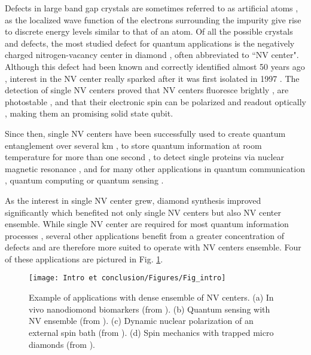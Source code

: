 \documentclass[a4paper, 11pt]{book}
\begin{document}
Defects in large band gap crystals are sometimes referred to as artificial atoms \citep{buluta2011natural}, as the localized wave function of the electrons surrounding the impurity  give rise to discrete energy levels similar to that of an atom. Of all the possible crystals and defects, the most studied defect for quantum applications is the negatively charged nitrogen-vacancy center in diamond \citep{aharonovich2016solid, de2021materials}, often abbreviated to ``NV center". Although this defect had been known and correctly identified almost 50 years ago \citep{davies1976optical}, interest in the NV center really sparked after it was first isolated in 1997 \citep{gruber1997scanning}. The detection of single NV centers proved that NV centers fluoresce brightly \citep{gruber1997scanning}, are photostable \citep{kurtsiefer2000stable}, and that their electronic spin can be polarized and readout optically \citep{jelezko2004observation}, making them an promising solid state qubit.

Since then, single NV centers have been successfully used to create quantum entanglement over several km \citep{hensen2015loophole}, to store quantum information at room temperature for more than one second \citep{maurer2012room}, to detect single proteins via nuclear magnetic resonance \citep{lovchinsky2016nuclear}, and for many other applications in quantum communication \citep{wehner2018quantum}, quantum computing \citep{de2021materials} or quantum sensing \citep{degen2017quantum}.

As the interest in single NV center grew, diamond synthesis improved significantly \citep{achard2020chemical, barry2020sensitivity, edmonds2020generation}  which benefited not only single NV centers but also NV center ensemble. While single NV center are required for most quantum information processes \citep{ladd2010quantum}, several other applications benefit from a greater concentration of defects and are therefore more suited to operate with NV centers ensemble. Four of these applications are pictured in Fig. \ref{shema introduction}.

\begin{figure}[h!]
\centering
\texttt{[image: Intro et conclusion/Figures/Fig\_intro]}
\caption{Example of applications with dense ensemble of NV centers. (a) In vivo nanodiomond biomarkers (from \citep{mohan2010vivo}). (b) Quantum sensing with NV ensemble (from \citep{ku2020imaging}). (c) Dynamic nuclear polarization of an external spin bath (from \citep{healey2021polarization}). (d) Spin mechanics with trapped micro diamonds (from \citep{delord2020spin}).}
\label{shema introduction}
\end{figure}
\end{document}
